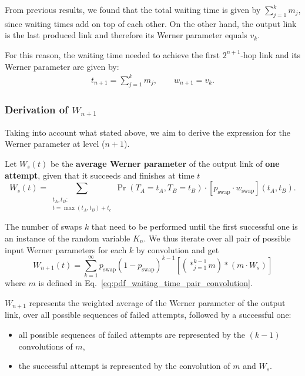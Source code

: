 \documentclass{masterthesis}
\begin{document}
From previous results, we found that the total waiting time is given by $\sum_{j=1}^{k} m_{j}$, since waiting times add on top of each other. On the other hand, the output link is the last produced link and therefore its Werner parameter equals $v_{k}$. 

For this reason, the waiting time needed to achieve the first $2^{n+1}$-hop link and its Werner parameter are given by:
\begin{align}
    t_{n+1} = \sum_{j=1}^{k} m_{j} , \quad\quad w_{n+1} = v_k .
\end{align}

\subsubsection*{Derivation of $W_{n+1}$}

Taking into account what stated above, we aim to derive the expression for the Werner parameter at level ($n+1$). %

Let $W_{s}(t)$ be the \textbf{average Werner parameter} of the output link of \textbf{one attempt}, given that it succeeds and finishes at time $t$
\begin{equation}
    W_s(t) = \sum_{\substack{t_A, t_B:\\ t = \max(t_A, t_B) + t_c}} \Pr(T_A = t_A, T_B = t_B) \cdot [p_\text{swap} \cdot w_\text{swap}](t_A, t_B) .
\end{equation}

The number of swaps $k$ that need to be performed until the first successful one is an instance of the random variable $K_{n}$.
We thus iterate over all pair of possible input Werner parameters for each $k$ by convolution and get
\begin{equation}\label{eq:werner_parameter_swap}
    W_{n+1}(t) = \sum_{k=1}^{\infty} p_\text{swap} {(1 - p_\text{swap})}^{k-1} \left[ \left( \ast_{j=1}^{k-1} m \right) \ast \left( m \cdot W_{s} \right) \right]
\end{equation}
where $m$ is defined in Eq.~\ref{eq:pdf_waiting_time_pair_convolution}.

$W_{n+1}$ represents the weighted average of the Werner parameter of the output link, over all possible sequences of failed attempts, followed by a successful one:
\begin{itemize}
    \item all possible sequences of failed attempts are represented by the $(k-1)$ convolutions of $m$,
    \item the successful attempt is represented by the convolution of $m$ and $W_{s}$.
\end{itemize}
\end{document}
